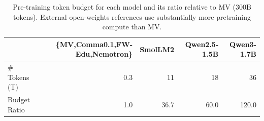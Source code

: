 \begin{table}[htbp]
\centering
\caption{Pre-training token budget for each model and its ratio relative to MV (300B tokens). External open-weights references use substantially more pretraining compute than MV.}
\label{tab:budget}
\small
\begin{tabular}{lrrrr}
\toprule
 & \textbf{\{MV,Comma0.1,FW-Edu,Nemotron\}} & \textbf{SmolLM2} & \textbf{Qwen2.5-1.5B} & \textbf{Qwen3-1.7B} \\
\midrule
\# Tokens (T) & 0.3 & 11 & 18 & 36 \\
Budget Ratio  & 1.0 & 36.7 & 60.0 & 120.0 \\
\bottomrule
\end{tabular}
\end{table}

